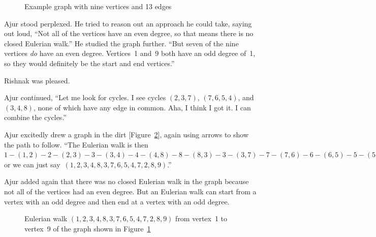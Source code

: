 \begin{figure}
\begin{center}
\caption{Example graph with nine vertices and 13 edges}\label{4g2}
\end{center}
\end{figure}

Ajur stood perplexed. He tried to reason out an approach he could take, saying out loud, ``Not all of the vertices have an even degree, so that means there is no closed Eulerian walk.''  He studied the graph further.  ``But seven of the nine vertices \textit{do} have an even degree. Vertices~1 and~9 both have an odd degree of~1, so they would definitely be the start and end vertices.''

Rishnak was pleased.

Ajur continued, ``Let me look for cycles.  I see cycles $(2,3,7)$, $(7,6,5,4)$, and $(3,4,8)$, none of which have any edge in common. Aha, I think I got it. I can combine the cycles.''

Ajur excitedly drew a graph in the dirt [Figure~\ref{4g25}], again using arrows to show the path to follow. ``The Eulerian walk is then $1-(1,2)-2-(2,3)-3-(3,4)-4-(4,8)-8-(8,3)-3-(3,7)-7-(7,6)-6-(6,5)-5-(5,4)-4-(4,7)-7-(7,2)-2-(2,8)-8-(8,9)-9$ or we can just say~$(1,2,3,4,8,3,7,6,5,4,7,2,8,9)$.''

Ajur added again that there was no closed Eulerian walk in the graph because not all of the vertices had an even degree. But an Eulerian walk can start from a vertex with an odd degree and then end at a vertex with an odd degree.

\begin{figure}
\begin{center}
\caption{Eulerian walk $(1,2,3,4,8,3,7,6,5,4,7,2,8,9)$ from vertex~1 to vertex~9 of the graph shown in Figure~\ref{4g2}}\label{4g25}
\end{center}
\end{figure}

